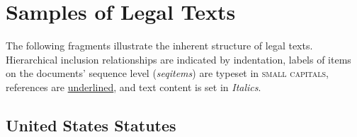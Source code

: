 \documentclass[utf8,sort&compress,numbers,square,table,hidelinks]{frontiers_suppmat} %
\begin{document}
\section{Samples of Legal Texts}
\label{sec:textsamples}

The following fragments illustrate the inherent structure of legal texts. 
Hierarchical inclusion relationships are indicated by indentation, 
labels of items on the documents' sequence level (\emph{seqitems}) are typeset in \textsc{small capitals}, 
references are \uline{underlined},
and text content is set in \emph{Italics}.\\

\vspace*{6pt}
\subsection{United States Statutes}
\end{document}
